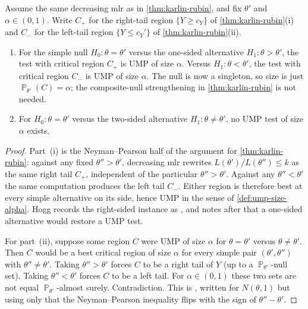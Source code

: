 \documentclass[11pt,a4paper]{article}
\DeclareMathOperator{\Pbb}{\mathbb{P}}
\begin{document}
\begin{proposition}
\label{prop:ump-point-null}
Assume the same decreasing mlr as in \cref{thm:karlin-rubin}, and fix \(\theta'\) and \(\alpha\in(0,1)\). Write \(C_+\) for the right-tail region \(\{Y\ge c_Y\}\) of \cref{thm:karlin-rubin}(i) and \(C_-\) for the left-tail region \(\{Y\le c_Y'\}\) of \cref{thm:karlin-rubin}(ii).
\begin{enumerate}[label=\textup{(\roman*)}]
    \item
    For the simple null \(H_0:\theta=\theta'\) versus the one-sided alternative \(H_1:\theta>\theta'\), the test with critical region \(C_+\) is UMP of size \(\alpha\). Versus \(H_1:\theta<\theta'\), the test with critical region \(C_-\) is UMP of size \(\alpha\). The null is now a singleton, so size is just \(\Pbb_{\theta'}(C)=\alpha\); the composite-null strengthening in \cref{thm:karlin-rubin} is not needed.
    \item
    For \(H_0:\theta=\theta'\) versus the two-sided alternative \(H_1:\theta\neq\theta'\), no UMP test of size \(\alpha\) exists.
\end{enumerate}
\end{proposition}

\begin{proof}
Part~(i) is the Neyman--Pearson half of the argument for \cref{thm:karlin-rubin}: against any fixed \(\theta''>\theta'\), decreasing mlr rewrites \(L(\theta')/L(\theta'')\le k\) as the same right tail \(C_+\), independent of the particular \(\theta''>\theta'\). Against any \(\theta''<\theta'\) the same computation produces the left tail \(C_-\). Either region is therefore best at every simple alternative on its side, hence UMP in the sense of \cref{def:ump-size-alpha}. Hogg records the right-sided instance as \citep[Example~8.2.2]{hogg2019}, and notes after \citep[Example~8.2.3]{hogg2019} that a one-sided alternative would restore a UMP test.

For part~(ii), suppose some region \(C\) were UMP of size \(\alpha\) for \(\theta=\theta'\) versus \(\theta\neq\theta'\). Then \(C\) would be a best critical region of size \(\alpha\) for every simple pair \((\theta',\theta'')\) with \(\theta''\neq\theta'\). Taking \(\theta''>\theta'\) forces \(C\) to be a right tail of \(Y\) (up to a \(\Pbb_{\theta'}\)-null set). Taking \(\theta''<\theta'\) forces \(C\) to be a left tail. For \(\alpha\in(0,1)\) these two sets are not equal \(\Pbb_{\theta'}\)-almost surely. Contradiction. This is \citep[Example~8.2.3]{hogg2019}, written for \(N(\theta,1)\) but using only that the Neyman--Pearson inequality flips with the sign of \(\theta''-\theta'\).
\end{proof}
\end{document}
